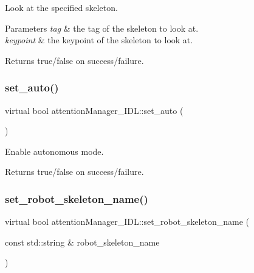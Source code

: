 Look at the specified skeleton. 


\begin{DoxyParams}{Parameters}
{\em tag} & the tag of the skeleton to look at. \\
\hline
{\em keypoint} & the keypoint of the skeleton to look at. \\
\hline
\end{DoxyParams}
\begin{DoxyReturn}{Returns}
true/false on success/failure. 
\end{DoxyReturn}
\mbox{\label{classattentionManager__IDL_a3c0c61fdb996d2b7378c02e6225a6c20}} 
\subsubsection{\texorpdfstring{set\+\_\+auto()}{set\_auto()}}
{\footnotesize\ttfamily virtual bool attention\+Manager\+\_\+\+I\+D\+L\+::set\+\_\+auto (\begin{DoxyParamCaption}{ }\end{DoxyParamCaption})\hspace{0.3cm}{\ttfamily [virtual]}}



Enable autonomous mode. 

\begin{DoxyReturn}{Returns}
true/false on success/failure. 
\end{DoxyReturn}
\mbox{\label{classattentionManager__IDL_ae50c946fce68f55cac50fe5136e1bc02}} 
\subsubsection{\texorpdfstring{set\+\_\+robot\+\_\+skeleton\+\_\+name()}{set\_robot\_skeleton\_name()}}
{\footnotesize\ttfamily virtual bool attention\+Manager\+\_\+\+I\+D\+L\+::set\+\_\+robot\+\_\+skeleton\+\_\+name (\begin{DoxyParamCaption}\item[{const std\+::string \&}]{robot\+\_\+skeleton\+\_\+name }\end{DoxyParamCaption})\hspace{0.3cm}{\ttfamily [virtual]}}



